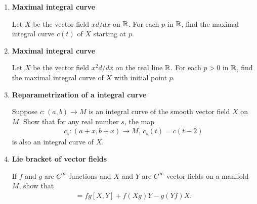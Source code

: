 \documentclass[12pt,a4paper]{report}
\begin{document}
\begin{enumerate}[label=14.\arabic*]
\begin{enumerate}[label=(\alph*)]
		\item Show that if $X$ is the zero vector field on a manifold $M$, and $c_t(p)$ is the maximal integral curve of $X$ starting at $p$, then the one-parameter group of diffeomorphisms $c: \R\to \operatorname{Diff}(M)$ is the constant map $c(t) \equiv \mathbf{I}_m$
	
	\end{enumerate}
	
	\item \textbf{Maximal integral curve}
	
	Let $X$ be the vector field $xd/dx$ on $\mathbb{R}$.  For each $p$ in $\mathbb{R}$, find the maximal integral curve $c(t)$ of $X$ starting at $p$.
	
	\item \textbf{Maximal integral curve}
	
	Let $X$ be the vector field $x^2 d/dx$ on the real line $\mathbb{R}$.  For each $p > 0$ in $\mathbb{R}$, find the maximal integral curve of $X$ with initial point $p$.
	
	\item \textbf{Reparametrization of a integral curve}
	
	Suppose $c:(a,b)\to M$ is an integral curve of the smooth vector field $X$ on $M$.  Show that for any real number $s$, the map
	\begin{align*}
		c_s: (a+x, b+x)\to M, \, c_s(t)=c(t-2)
	\end{align*}is also an integral curve of $X$.
	
	\item \textbf{Lie bracket of vector fields}
	
	If $f$ and $g$ are $C^\infty$ functions and $X$ and $Y$ are $C^\infty$ vector fields on a manifold $M$, show that 
	\begin{align*}
		[fX,gY] = fg[X,Y]+f(Xg)Y-g(Yf)X.
	\end{align*}
	

\end{enumerate}
\end{document}
